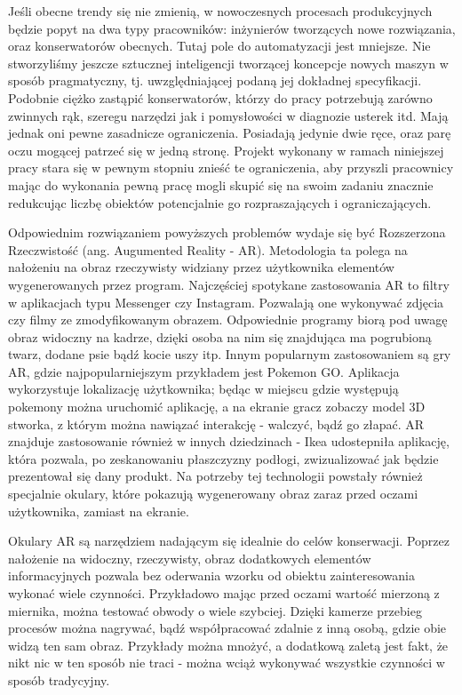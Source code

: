 \documentclass[12pt,twoside]{article}
\begin{document}
Jeśli obecne trendy się nie zmienią, w nowoczesnych procesach produkcyjnych będzie popyt na dwa typy pracowników: inżynierów tworzących nowe rozwiązania, oraz konserwatorów obecnych. Tutaj pole do automatyzacji jest mniejsze. Nie stworzyliśmy jeszcze sztucznej inteligencji tworzącej koncepcje nowych maszyn w sposób pragmatyczny, tj. uwzględniającej podaną jej dokładnej specyfikacji. Podobnie ciężko zastąpić konserwatorów, którzy do pracy potrzebują zarówno zwinnych rąk, szeregu narzędzi jak i pomysłowości w diagnozie usterek itd. Mają jednak oni pewne zasadnicze ograniczenia. Posiadają jedynie dwie ręce, oraz parę oczu mogącej patrzeć się w jedną stronę. Projekt wykonany w ramach niniejszej pracy stara się w pewnym stopniu znieść te ograniczenia, aby przyszli pracownicy mając do wykonania pewną pracę mogli skupić się na swoim zadaniu znacznie redukcując liczbę obiektów potencjalnie go rozpraszających i ograniczających.

Odpowiednim rozwiązaniem powyższych problemów wydaje się być Rozszerzona Rzeczwistość (ang. Augumented Reality - AR). Metodologia ta polega na nałożeniu na obraz rzeczywisty widziany przez użytkownika elementów wygenerowanych przez program. Najczęściej spotykane zastosowania AR to filtry w aplikacjach typu Messenger czy Instagram. Pozwalają one wykonywać zdjęcia czy filmy ze zmodyfikowanym obrazem. Odpowiednie programy biorą pod uwagę obraz widoczny na kadrze, dzięki osoba na nim się znajdująca ma pogrubioną twarz, dodane psie bądź kocie uszy itp. Innym popularnym zastosowaniem są gry AR, gdzie najpopularniejszym przykładem jest Pokemon GO. Aplikacja wykorzystuje lokalizację użytkownika; będąc w miejscu gdzie występują pokemony można uruchomić aplikację, a na ekranie gracz zobaczy model 3D stworka, z którym można nawiązać interakcję - walczyć, bądź go złapać. AR znajduje zastosowanie również w innych dziedzinach - Ikea udostepniła aplikację, która pozwala, po zeskanowaniu płaszczyzny podłogi, zwizualizować jak będzie prezentował się dany produkt. Na potrzeby tej technologii powstały również specjalnie okulary, które pokazują wygenerowany obraz zaraz przed oczami użytkownika, zamiast na ekranie.

Okulary AR są narzędziem nadającym się idealnie do celów konserwacji. Poprzez nałożenie na widoczny, rzeczywisty, obraz dodatkowych elementów informacyjnych pozwala bez oderwania wzorku od obiektu zainteresowania wykonać wiele czynności. Przykładowo mając przed oczami wartość mierzoną z miernika, można testować obwody o wiele szybciej. Dzięki kamerze przebieg procesów można nagrywać, bądź współpracować zdalnie z inną osobą, gdzie obie widzą ten sam obraz. Przykłady można mnożyć, a dodatkową zaletą jest fakt, że nikt nic w ten sposób nie traci - można wciąż wykonywać wszystkie czynności w sposób tradycyjny.
\end{document}
